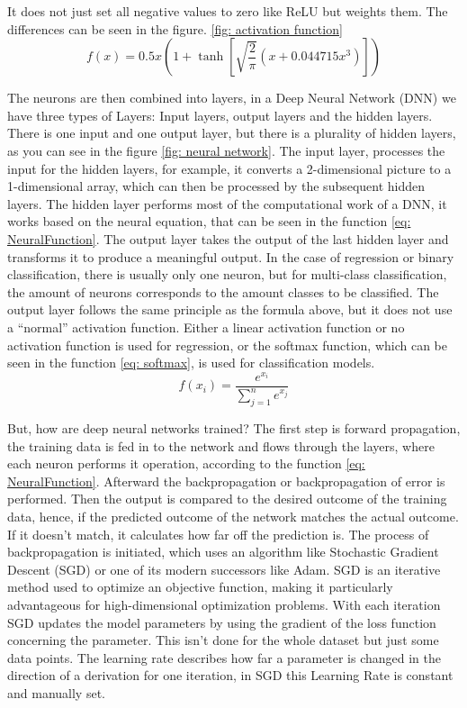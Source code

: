 It does not just set all negative values to zero like ReLU but weights them.
The differences can be seen in the figure. \ref{fig: activation function}
\begin{equation}
    f(x) = 0.5x\left ( 1+\tanh\left [ \sqrt{\frac{2}{\pi}}\left ( x+0.044715x^3 \right ) \right ] \right )
    \label{eq: gelu}
\end{equation}

The neurons are then combined into layers, in a Deep Neural Network (DNN) we have three types of Layers:
Input layers, output layers and the hidden layers.
There is one input and one output layer, but there is a plurality of hidden layers, as you can see in the figure \ref{fig: neural network}.
The input layer, processes the input for the hidden layers, for example, it converts a 2-dimensional picture to a 1-dimensional array, which can then be processed by the subsequent hidden layers.
The hidden layer performs most of the computational work of a DNN, it works based on the neural equation, that can be seen in the function \ref{eq: NeuralFunction}.
The output layer takes the output of the last hidden layer and transforms it to produce a meaningful output.
In the case of regression or binary classification, there is usually only one neuron, but for multi-class classification, the amount of neurons corresponds to the amount classes to be classified.
The output layer follows the same principle as the formula above, but it does not use a ``normal'' activation function.
Either a linear activation function or no activation function is used for regression, or the softmax function, which can be seen in the function \ref{eq: softmax}, is used for classification models.
\begin{equation}
    f(x_i) = \frac{e^{x_i}}{\sum^n_{j=1}e^{x_j}}
    \label{eq: softmax}
\end{equation}

But, how are deep neural networks trained? \cite{lecun_deep_2015}
The first step is forward propagation, the training data is fed in to the network and flows through the layers, where each neuron performs it operation, according to the function \ref{eq: NeuralFunction}.
Afterward the backpropagation or backpropagation of error is performed. \cite{rumelhart_learning_1986}
Then the output is compared to the desired outcome of the training data, hence, if the predicted outcome of the network matches the actual outcome.
If it doesn't match, it calculates how far off the prediction is.
The process of backpropagation is initiated, which uses an algorithm like Stochastic Gradient Descent (SGD) or one of its modern successors like Adam.
SGD is an iterative method used to optimize an objective function, making it particularly advantageous for high-dimensional optimization problems.
With each iteration SGD updates the model parameters by using the gradient of the loss function concerning the parameter.
This isn't done for the whole dataset but just some data points.
The learning rate describes how far a parameter is changed in the direction of a derivation for one iteration, in SGD this Learning Rate is constant and manually set.

